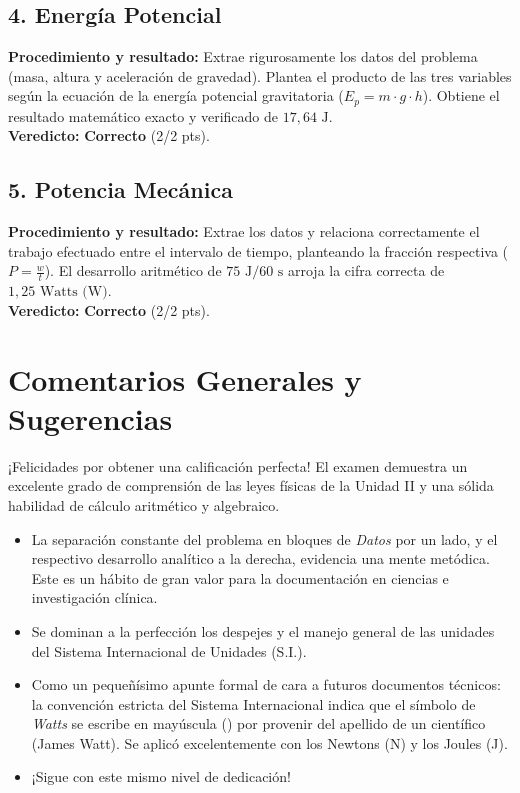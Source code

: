 \documentclass[12pt,letterpaper]{article}
\begin{document}
\subsection*{4. Energía Potencial}
\textbf{Procedimiento y resultado:} Extrae rigurosamente los datos del problema (masa, altura y aceleración de gravedad). Plantea el producto de las tres variables según la ecuación de la energía potencial gravitatoria ($E_p = m \cdot g \cdot h$). Obtiene el resultado matemático exacto y verificado de $17,64 \text{ J}$. \\
\textbf{Veredicto:} \textbf{Correcto} (2/2 pts).

\subsection*{5. Potencia Mecánica}
\textbf{Procedimiento y resultado:} Extrae los datos y relaciona correctamente el trabajo efectuado entre el intervalo de tiempo, planteando la fracción respectiva ($P = \frac{w}{t}$). El desarrollo aritmético de $75 \text{ J} / 60 \text{ s}$ arroja la cifra correcta de $1,25 \text{ Watts (W)}$. \\
\textbf{Veredicto:} \textbf{Correcto} (2/2 pts).

\vspace{0.5cm}
\section*{Comentarios Generales y Sugerencias}
¡Felicidades por obtener una calificación perfecta! El examen demuestra un excelente grado de comprensión de las leyes físicas de la Unidad II y una sólida habilidad de cálculo aritmético y algebraico.
\begin{itemize}
    \item La separación constante del problema en bloques de \textit{Datos} por un lado, y el respectivo desarrollo analítico a la derecha, evidencia una mente metódica. Este es un hábito de gran valor para la documentación en ciencias e investigación clínica.
    \item Se dominan a la perfección los despejes y el manejo general de las unidades del Sistema Internacional de Unidades (S.I.).
    \item Como un pequeñísimo apunte formal de cara a futuros documentos técnicos: la convención estricta del Sistema Internacional indica que el símbolo de \textit{Watts} se escribe en mayúscula () por provenir del apellido de un científico (James Watt). Se aplicó excelentemente con los Newtons (N) y los Joules (J).
    \item ¡Sigue con este mismo nivel de dedicación!
\end{itemize}
\end{document}
